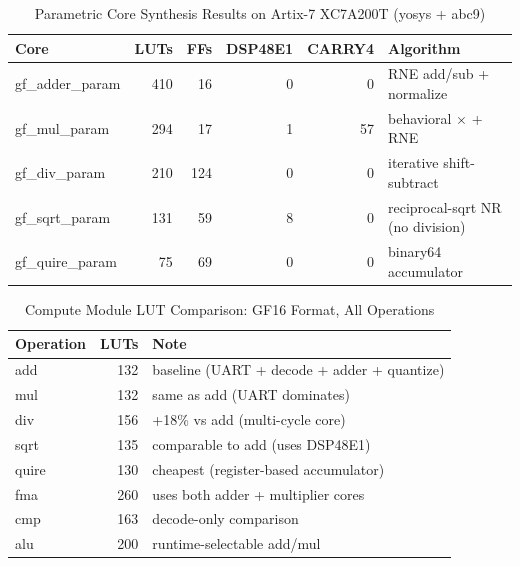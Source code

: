 
\begin{table}[htbp]
\centering
\caption{Parametric Core Synthesis Results on Artix-7 XC7A200T (yosys + abc9)}
\label{tab:core-synth}
\begin{tabular}{lrrrrl}
\toprule
Core & LUTs & FFs & DSP48E1 & CARRY4 & Algorithm \\
\midrule
gf\_adder\_param & 410 & 16 & 0 & 0 & RNE add/sub + normalize \\
gf\_mul\_param   & 294 & 17 & 1 & 57 & behavioral $\times$ + RNE \\
gf\_div\_param   & 210 & 124 & 0 & 0 & iterative shift-subtract \\
gf\_sqrt\_param  & 131 & 59 & 8 & 0 & reciprocal-sqrt NR (no division) \\
gf\_quire\_param & 75  & 69 & 0 & 0 & binary64 accumulator \\
\bottomrule
\end{tabular}
\end{table}

\begin{table}[htbp]
\centering
\caption{Compute Module LUT Comparison: GF16 Format, All Operations}
\label{tab:gf16-ops}
\begin{tabular}{lrl}
\toprule
Operation & LUTs & Note \\
\midrule
add    & 132 & baseline (UART + decode + adder + quantize) \\
mul    & 132 & same as add (UART dominates) \\
div    & 156 & +18\% vs add (multi-cycle core) \\
sqrt   & 135 & comparable to add (uses DSP48E1) \\
quire  & 130 & cheapest (register-based accumulator) \\
fma    & 260 & uses both adder + multiplier cores \\
cmp    & 163 & decode-only comparison \\
alu    & 200 & runtime-selectable add/mul \\
\bottomrule
\end{tabular}
\end{table}

